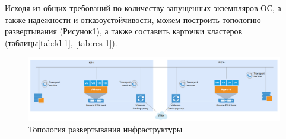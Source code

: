 \documentclass[14pt, a4paper]{extarticle}
\begin{document}
Исходя из общих требований по количеству запущенных экземпляров ОС, а
также надежности и отказоустойчивости, можем построить топологию
развертывания (Рисунок\;\ref{fig:topology}), а также составить карточки кластеров\cite{trinity} (таблицы\;\ref{tab:kl-1}, \;\ref{tab:res-1}).


\begin{figure}[H]
\includegraphics[scale=0.33]{topology.png}
\caption{Топология развертывания инфраструктуры\label{fig:topology}}
\end{figure}
\end{document}
